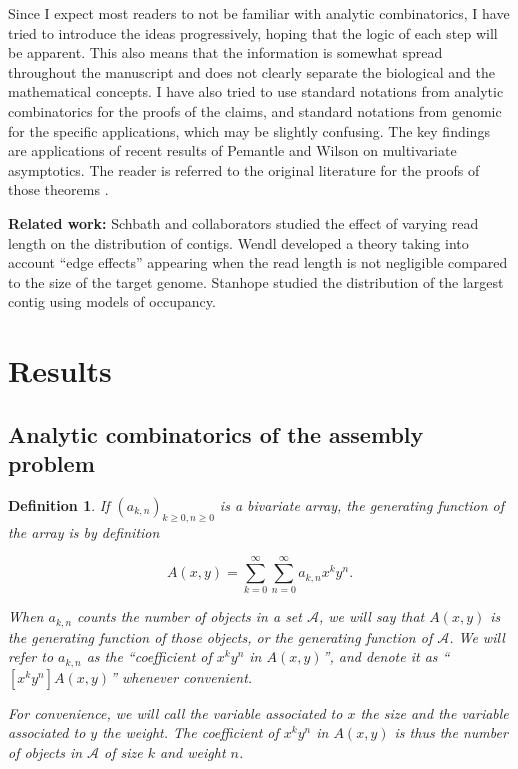 \documentclass{article}
\newtheorem{definition}{Definition}
\begin{document}
Since I expect most readers to not be familiar with analytic
combinatorics, I have tried to introduce the ideas progressively, hoping
that the logic of each step will be apparent. This also means that the
information is somewhat spread throughout the manuscript and does not
clearly separate the biological and the mathematical concepts. I have also
tried to use standard notations from analytic combinatorics for the proofs
of the claims, and standard notations from genomic for the specific
applications, which may be slightly confusing.  The key findings are
applications of recent results of Pemantle and Wilson on multivariate
asymptotics. The reader is referred to the original literature for the
proofs of those theorems \cite{PemWil08,AnalComb2013}.

\textbf{Related work:} Schbath and collaborators \cite{pmid10890387}
studied the effect of varying read length on the distribution of contigs.
Wendl \cite{pmid16901236} developed a theory taking into account ``edge
effects'' appearing when the read length is not negligible compared to the
size of the target genome. Stanhope \cite{pmid20686599} studied the
distribution of the largest contig using models of occupancy.


\section{Results}

\subsection{Analytic combinatorics of the assembly problem}
\label{subsec:config}

\begin{definition}
If $(a_{k,n})_{k \geq 0, n \geq 0}$ is a bivariate array, the generating
function of the array is by definition

\begin{equation*}
A(x,y) = \sum_{k=0}^\infty \sum_{n=0}^\infty a_{k,n}x^ky^n.
\end{equation*}

When $a_{k,n}$ counts the number of objects in a set $\mathcal{A}$, we
will say that $A(x,y)$ is the generating function of those objects, or the
generating function of $\mathcal{A}$. We will refer to $a_{k,n}$ as the
``coefficient of $x^ky^n$ in $A(x,y)$'', and denote it as ``$[x^ky^n]
A(x,y)$'' whenever convenient.

For convenience, we will call the variable associated to $x$ the
\emph{size} and the variable associated to $y$ the \emph{weight}. The
coefficient of $x^ky^n$ in $A(x,y)$ is thus the number of objects in
$\mathcal{A}$ of size $k$ and weight $n$.
\end{definition}
\end{document}
